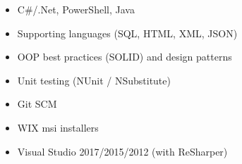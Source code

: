 \begin{itemize}
	\item C\#/.Net, PowerShell, Java
	\item Supporting languages (SQL, HTML, XML, JSON)
	\item OOP best practices (SOLID) and design patterns
	\item Unit testing (NUnit / NSubstitute)
	\item Git SCM
	\item WIX msi installers
	\item Visual Studio 2017/2015/2012 (with ReSharper)
\end{itemize}